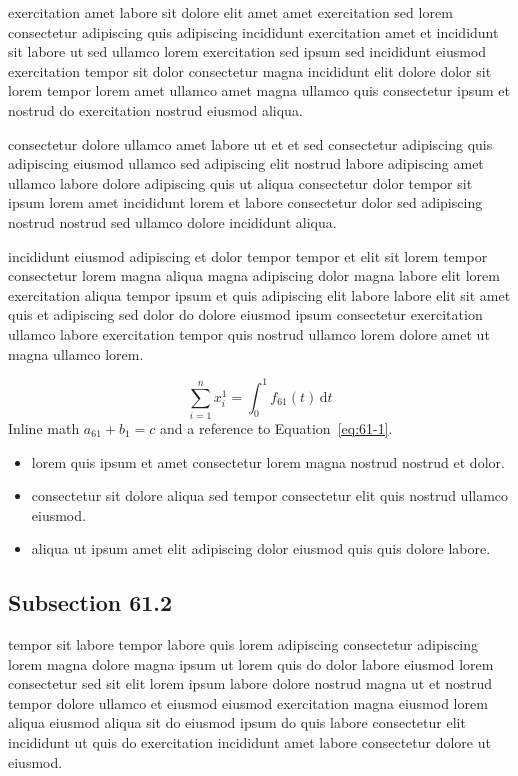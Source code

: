 \documentclass{article}
\begin{document}
exercitation amet labore sit dolore elit amet amet exercitation sed lorem consectetur adipiscing quis adipiscing incididunt exercitation amet et incididunt sit labore ut sed ullamco lorem exercitation sed ipsum sed incididunt eiusmod exercitation tempor sit dolor consectetur magna incididunt elit dolore dolor sit lorem tempor lorem amet ullamco amet magna ullamco quis consectetur ipsum et nostrud do exercitation nostrud eiusmod aliqua.

consectetur dolore ullamco amet labore ut et et sed consectetur adipiscing quis adipiscing eiusmod ullamco sed adipiscing elit nostrud labore adipiscing amet ullamco labore dolore adipiscing quis ut aliqua consectetur dolor tempor sit ipsum lorem amet incididunt lorem et labore consectetur dolor sed adipiscing nostrud nostrud sed ullamco dolore incididunt aliqua.

incididunt eiusmod adipiscing et dolor tempor tempor et elit sit lorem tempor consectetur lorem magna aliqua magna adipiscing dolor magna labore elit lorem exercitation aliqua tempor ipsum et quis adipiscing elit labore labore elit sit amet quis et adipiscing sed dolor do dolore eiusmod ipsum consectetur exercitation ullamco labore exercitation tempor quis nostrud ullamco lorem dolore amet ut magna ullamco lorem.

\begin{equation}\label{eq:61-1}
  \sum_{i=1}^{n} x_i^{1} = \int_0^1 f_{61}(t)\,\mathrm{d}t
\end{equation}
Inline math $a_{61} + b_{1} = c$ and a reference to Equation~\eqref{eq:61-1}.

\begin{itemize}
  \item lorem quis ipsum et amet consectetur lorem magna nostrud nostrud et dolor.
  \item consectetur sit dolore aliqua sed tempor consectetur elit quis nostrud ullamco eiusmod.
  \item aliqua ut ipsum amet elit adipiscing dolor eiusmod quis quis dolore labore.
\end{itemize}

\subsection{Subsection 61.2}\label{sec:61-2}
tempor sit labore tempor labore quis lorem adipiscing consectetur adipiscing lorem magna dolore magna ipsum ut lorem quis do dolor labore eiusmod lorem consectetur sed sit elit lorem ipsum labore dolore nostrud magna ut et nostrud tempor dolore ullamco et eiusmod eiusmod exercitation magna eiusmod lorem aliqua eiusmod aliqua sit do eiusmod ipsum do quis labore consectetur elit incididunt ut quis do exercitation incididunt amet labore consectetur dolore ut eiusmod.
\end{document}
